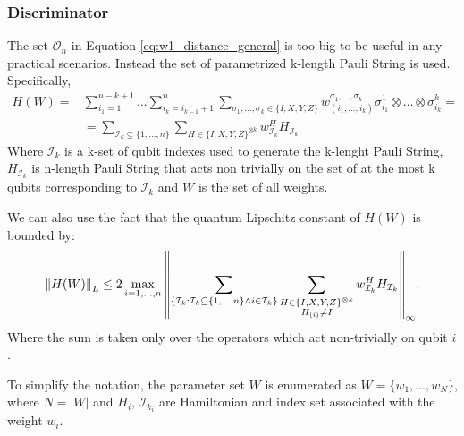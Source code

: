 \subsubsection{Discriminator}
The set $\mathcal{O}_n$ in Equation \ref{eq:w1_distance_general} is too big to
be useful in any practical scenarios. Instead the set of parametrized k-length
Pauli String is used. Specifically,
\begin{equation}
\begin{split}
  \label{eq:parametrized_hamiltonian}
  H(W) = & \sum_{i_1 = 1}^{n-k+1} \ldots \sum_{i_k = i_{k-1} + 1}^{n}\sum_{\sigma_1, \ldots, \sigma_k \in \{I, X, Y, Z\}} w^{\sigma_1,
    \ldots, \sigma_k}_{(i_1, \ldots, i_k)} \sigma^1_{i_1} \otimes \ldots \otimes \sigma^k_{i_k}  = \\
  & = \sum_{\mathcal{I}_k \subseteq \{1, \ldots, n \}} \sum_{H \in \{ I,X,Y,Z \}^{\otimes k}} w_{\mathcal{I}_k}^HH_{\mathcal{I}_k}
\end{split}
\end{equation}
Where $\mathcal{I}_k$ is a k-set of qubit indexes used to generate the k-lenght
Pauli String, $H_{\mathcal{I}_k}$ is n-length Pauli String that acts non
trivially on the set of at the most k qubits
corresponding to $\mathcal{I}_k$ and $W$ is the set of all weights.

We can also use the fact that the quantum Lipschitz constant of $H(W)$ is
bounded by:
\begin{equation}
  \label{eq:quantum_lipschitz_bound}
  \left\lVert H(W)\right\rVert_L \leq 2 \max_{i = 1,\ldots,n}{\left\lVert\sum_{\{ \mathcal{I}_k: \mathcal{I}_k \subseteq \{1, \ldots, n \} \land i \in \mathcal{I}_k \}}
      \sum_{\substack{H \in \{ I,X,Y,Z \}^{\otimes k} \\
        H_{(i)} \neq I
      }} w_{\mathcal{I}_k}^HH_{\mathcal{I}_k} \right\rVert_{\infty}}.
\end{equation}
Where the sum is taken only over the operators which act non-trivially on qubit
$i$\cite{kiani2021quantum}. 

To simplify the notation, the parameter set $W$ is enumerated as $W=\{w_1,
  \ldots, w_N\}$, where $N=|W|$ and $H_i$, $\mathcal{I}_{k_i}$ are Hamiltonian and index set
associated with the weight $w_i$.

